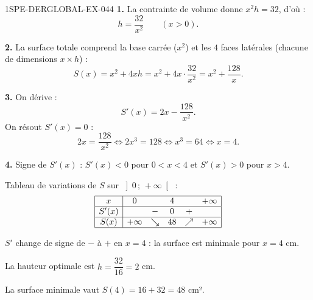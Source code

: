 \begin{corrige}{1SPE-DERGLOBAL-EX-044}
\textbf{1.} La contrainte de volume donne $x^2 h = 32$, d'où :
\[
h = \frac{32}{x^2} \qquad (x > 0).
\]

\textbf{2.} La surface totale comprend la base carrée ($x^2$) et les $4$ faces latérales
(chacune de dimensions $x \times h$) :
\[
S(x) = x^2 + 4xh = x^2 + 4x \cdot \frac{32}{x^2} = x^2 + \frac{128}{x}.
\]

\textbf{3.} On dérive :
\[
S'(x) = 2x - \frac{128}{x^2}.
\]
On résout $S'(x) = 0$ :
\[
2x = \frac{128}{x^2} \iff 2x^3 = 128 \iff x^3 = 64 \iff x = 4.
\]

\textbf{4.} Signe de $S'(x)$ : $S'(x) < 0$ pour $0 < x < 4$ et $S'(x) > 0$ pour $x > 4$.

Tableau de variations de $S$ sur $\left]0\,;\,+\infty\right[$ :
\[
\begin{array}{|c|ccccc|}
\hline
x     & 0 & & 4 & & +\infty \\
\hline
S'(x) &   & - & 0 & + & \\
\hline
S(x)  & +\infty & \searrow & 48 & \nearrow & +\infty \\
\hline
\end{array}
\]

$S'$ change de signe de $-$ à $+$ en $x = 4$ : la surface est minimale pour $x = \boxed{4}$ cm.

La hauteur optimale est $h = \dfrac{32}{16} = \boxed{2}$ cm.

La surface minimale vaut $S(4) = 16 + 32 = \boxed{48}$ cm².
\end{corrige}
